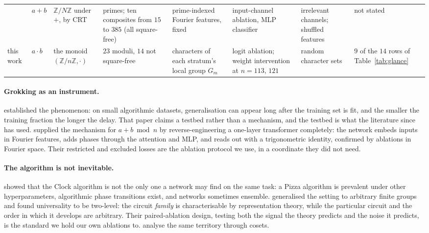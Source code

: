 \begin{table}[t]
\begin{tabular}{L{0.10\textwidth} L{0.055\textwidth} L{0.12\textwidth} L{0.14\textwidth}
      L{0.13\textwidth} L{0.15\textwidth} L{0.12\textwidth} L{0.075\textwidth}}
    \citet{hwang2026pfe} & $a + b$ & $\mathbb{Z}/N\mathbb{Z}$ under $+$, by CRT & primes; ten composites from $15$ to $385$ (all square-free) & prime-indexed Fourier features, fixed & input-channel ablation, MLP classifier & irrelevant channels; shuffled features & not stated \\
    this work & $a \cdot b$ & the monoid $(\mathbb{Z}/n\mathbb{Z}, \cdot)$ & $23$ moduli, $14$ not square-free & characters of each stratum's local group $G_{m}$ & logit ablation; weight intervention at $n = 113$, $121$ & random character sets & $9$ of the $14$ rows of Table~\ref{tab:glance} \\
    \bottomrule
  \end{tabular}
\end{table}

\paragraph{Grokking as an instrument.} \citet{power2022grokking} established the phenomenon:
on small algorithmic datasets, generalisation can appear long after the training set is fit,
and the smaller the training fraction the longer the delay. That paper claims a testbed rather
than a mechanism, and the testbed is what the literature since has used.
\citet{nanda2023progress} supplied the mechanism for $a + b \bmod n$ by reverse-engineering a
one-layer transformer completely: the network embeds inputs in Fourier features, adds phases
through the attention and MLP, and reads out with a trigonometric identity, confirmed by
ablations in Fourier space. Their restricted and excluded losses are the ablation protocol we
use, in a coordinate they did not need.

\paragraph{The algorithm is not inevitable.} \citet{zhong2023clock} showed that the Clock
algorithm is not the only one a network may find on the same task: a Pizza algorithm is
prevalent under other hyperparameters, algorithmic phase transitions exist, and networks
sometimes ensemble. \citet{chughtai2023toy} generalised the setting to arbitrary finite groups
and found universality to be two-level: the circuit \emph{family} is characterisable by
representation theory, while the particular circuit and the order in which it develops are
arbitrary. Their paired-ablation design, testing both the signal the theory predicts and the
noise it predicts, is the standard we hold our own ablations to.
\citet{stander2024cosets} analyse the same territory through cosets.

